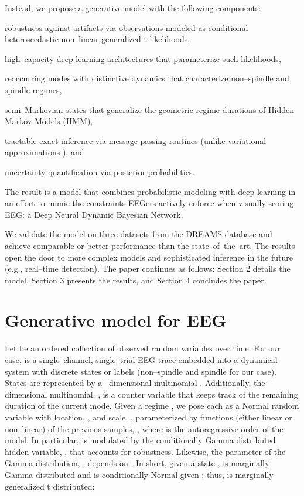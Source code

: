 \documentclass[runningheads]{llncs}
\begin{document}
Instead, we propose a generative model with the following components: \begin{enumerate*}[label=\roman*)]
	\item robustness against artifacts via observations modeled as conditional heteroscedastic non--linear generalized t likelihoods,
	\item high--capacity deep learning architectures that parameterize such likelihoods,
	\item reoccurring modes with distinctive dynamics that characterize non--spindle and spindle regimes,
	\item semi--Markovian states that generalize the geometric regime durations of Hidden Markov Models (HMM),
	\item tractable exact inference via message passing routines (unlike variational approximations \cite{johnson2016composing,ebbers2017hidden,krishnan2017structured,dong2020collapsed}), and
	\item uncertainty quantification via posterior probabilities.
\end{enumerate*}
The result is a model that combines probabilistic modeling with deep learning in an effort to mimic the constraints EEGers actively enforce when visually scoring EEG: a Deep Neural Dynamic Bayesian Network.

We validate the model on three datasets from the DREAMS database \cite{stephanie_devuyst_2005_2650142} and achieve comparable or better performance than the state--of--the--art. The results open the door to more complex models and sophisticated inference in the future (e.g., real--time detection). The paper continues as follows: Section 2 details the model, Section 3 presents the results, and Section 4 concludes the paper.

\section{Generative model for EEG}
\label{sec:methods}
Let  be an ordered collection of  observed random variables over time. For our case,  is a single--channel, single--trial EEG trace embedded into a dynamical system with  discrete states or labels (non--spindle and spindle for our case). States are represented by a --dimensional multinomial . Additionally, the --dimensional multinomial, , is a counter variable that keeps track of the remaining duration of the current mode. Given a regime , we pose each  as a Normal random variable with location, , and scale, , parameterized by functions (either linear or non--linear) of the previous  samples, , where  is the autoregressive order of the model. In particular,  is modulated by the conditionally Gamma distributed hidden variable, , that accounts for robustness. Likewise, the parameter of the Gamma distribution, , depends on . In short, given a state ,  is marginally Gamma distributed and  is conditionally Normal given ; thus,  is marginally generalized t distributed:
\end{document}
